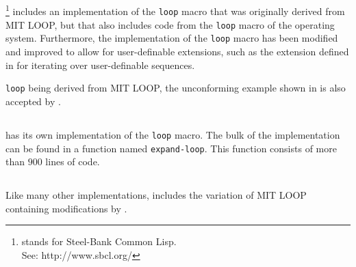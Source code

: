 \subsection{\sbcl{}}

\sbcl{} %
\footnote{\sbcl{} stands for Steel-Bank Common Lisp.\\
See: http://www.sbcl.org/}
includes an implementation of the \texttt{loop} macro that was
originally derived from MIT LOOP, but that also includes code from the
\texttt{loop} macro of the \genera{} operating system.  Furthermore,
the \sbcl{} implementation of the \texttt{loop} macro has been
modified and improved to allow for user-definable extensions, such as
the extension defined in \cite{Rhodes:2007:USC:1622123.1622138} for
iterating over user-definable sequences.

\sbcl{} \texttt{loop} being derived from MIT LOOP, the unconforming
example shown in  is also accepted by \sbcl{}.

\subsection{\clisp{}}

\clisp{} has its own implementation of the \texttt{loop} macro.  The
bulk of the implementation can be found in a function named
\texttt{expand-loop}.  This function consists of more than $900$ lines
of code.

\subsection{\ccl{}}

Like many other implementations, \ccl{} includes the variation of MIT
LOOP containing modifications by \symbolics{}.
